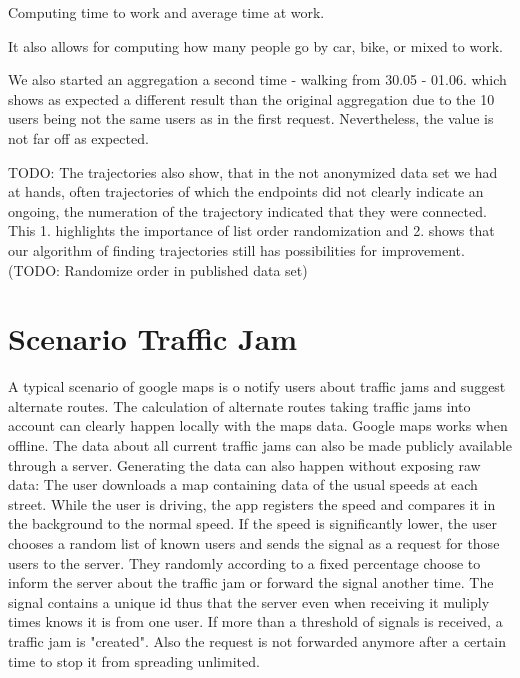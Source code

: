 Computing time to work and average time at work.

It also allows for computing how many people go by car, bike, or mixed to work.

We also started an aggregation a second time - walking from 30.05 - 01.06. which shows as expected a different result than the original aggregation due to the 10 users being not the same users as in the first request. Nevertheless, the value is not far off as expected.

TODO:
The trajectories also show, that in the not anonymized data set we had at hands, often trajectories of which the endpoints did not clearly indicate an ongoing, the numeration of the trajectory indicated that they were connected. This 1. highlights the importance of list order randomization and 2. shows that our algorithm of finding trajectories still has possibilities for improvement. (TODO: Randomize order in published data set)

\section{Scenario Traffic Jam}
A typical scenario of google maps is o notify users about traffic jams and suggest alternate routes. The calculation of alternate routes taking traffic jams into account can clearly happen locally with the maps data. Google maps works when offline. The data about all current traffic jams can also be made publicly available through a server. Generating the data can also happen without exposing raw data: The user downloads a map containing data of the usual speeds at each street. While the user is driving, the app registers the speed and compares it in the background to the normal speed. If the speed is significantly lower, the user chooses a random list of known users and sends the signal as a request for those users to the server. They randomly according to a fixed percentage choose to inform the server about the traffic jam or forward the signal another time. The signal contains a unique id thus that the server even when receiving it muliply times knows it is from one user. If more than a threshold of signals is received, a traffic jam is "created". Also the request is not forwarded anymore after a certain time to stop it from spreading unlimited.

